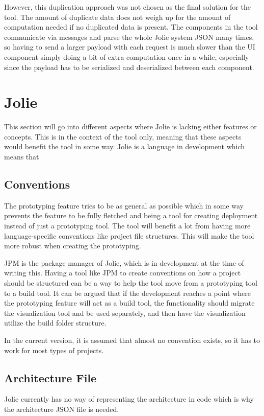 However, this duplication approach was not chosen as the final solution for the tool.
The amount of duplicate data does not weigh up for the amount of computation needed if no duplicated data is present.
The components in the tool communicate via messages and parse the whole Jolie system JSON many times, so having to send a larger payload with each request is much slower than the UI component simply doing a bit of extra computation once in a while, especially since the payload has to be serialized and deserialized between each component.

\section{Jolie}
This section will go into different aspects where Jolie is lacking either features or concepts.
This is in the context of the tool only, meaning that these aspects would benefit the tool in some way.
Jolie is a language in development which means that 

\subsection{Conventions}
The prototyping feature tries to be as general as possible which in some way prevents the feature to be fully fletched
and being a tool for creating deployment instead of just a prototyping tool.
The tool will benefit a lot from having more language-specific conventions like project file structures.
This will make the tool more robust when creating the prototyping.

JPM is the package manager of Jolie, which is in development at the time of writing this. Having a tool like JPM to create conventions on how a project should be structured can be a way to help the tool move from a prototyping tool to a build tool.
It can be argued that if the development reaches a point where the prototyping feature will act as a build tool, the functionality
should migrate the visualization tool and be used separately, and then have the visualization utilize the build folder structure.

In the current version, it is assumed that almost no convention exists, so it has to work for most types of projects.


\subsection{Architecture File}
Jolie currently has no way of representing the architecture in code which is why the architecture JSON file is needed.

